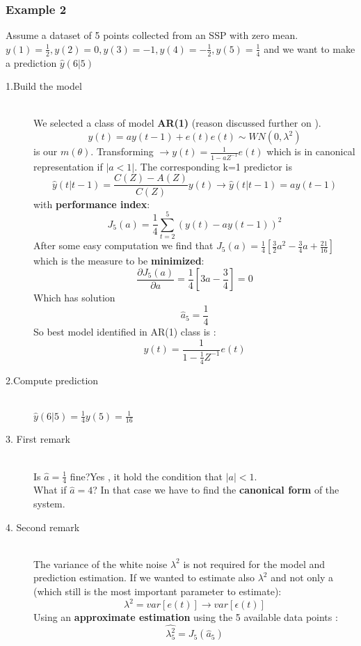 \subsubsection{Example 2}
Assume a dataset of 5 points collected from an SSP with zero mean.
$ y(1)= \frac{1}{2}, y(2) = 0 , y(3) = -1 , y(4) = -\frac{1}{2}, y(5)= \frac{1}{4}$
and we want to make a prediction $ \hat{y}(6|5) $
\begin{description}
\item[1.Build the model]\hfill\\
We selected a class of model \textbf{AR(1)} (reason discussed further on ).
$$ y(t) = ay(t-1)+e(t) e(t) \sim WN(0,\lambda^2)$$ is our $ m(\theta) $.
Transforming $ \to y(t) = \frac{1}{1-aZ^{-1}}e(t) $ which is in canonical representation if $|a<1|$.
The corresponding k=1 predictor is $$ \hat{y}(t|t-1) =\frac{C(Z) - A(Z)}{C(Z)}y(t) \to \hat{y}(t|t-1) = ay(t-1) $$ with \textbf{performance index}:
$$ J_5(a)= \frac{1}{4} \sum\limits_{t=2}^{5} (y(t) -ay(t-1))^2$$
After some easy computation we find that $ J_5(a) = \frac{1}{4}[\frac{3}{2}a^2 -\frac{3}{4}a+\frac{21}{16}]$ which is the measure to be \textbf{minimized}:
$$ \frac{\partial{J_5(a)}}{\partial{a}}= \frac{1}{4}[3a-\frac{3}{4}]=0$$
Which has solution $$ \hat{a}_5=\frac{1}{4}$$ So best model identified in AR(1) class is : 
\[
\boxed{y(t) = \frac{1}{1-\frac{1}{4}Z^{-1}}e(t)}
\]
\item[2.Compute prediction]\hfill\\
$ \hat{y}(6|5) = \frac{1}{4}y(5) = \frac{1}{16}$
\item[3. First remark]\hfill\\
Is $\hat{a}= \frac{1}{4}$ fine?Yes , it hold the condition that $|a|<1$.\\
What if $\hat{a}=4$? In that case we have to find the \textbf{canonical form} of the system.
\item[4. Second remark]\hfill\\
The variance of the white noise $\lambda^2$ is not required for the model and prediction estimation.  If we wanted to estimate also $\lambda^2$ and not only a (which still is the most important parameter to estimate):
$$ \lambda^2 = var[e(t)] \to var[\epsilon(t)]$$
Using an \textbf{approximate estimation} using the 5 available data points :
$$ \hat{\lambda_{5}^2} = J_5(\hat{a}_5)$$
\end{description}
\newpage

